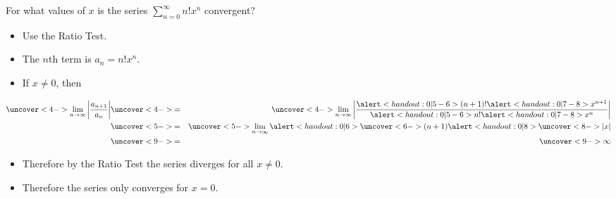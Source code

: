 \begin{frame}
\begin{example}[Example 1, p. 759]
For what values of $x$ is the series $\sum_{n=0}^\infty n! x^n$ convergent?
\begin{itemize}
\item<2->  Use the Ratio Test.
\item<3->  The $n$th term is $a_n = n! x^n$.
\item<4->  If $x\neq 0$, then
\end{itemize}
\abovedisplayskip=0pt
\belowdisplayskip=0pt
\begin{eqnarray*}
\uncover<4->{%
\lim_{n\to\infty} \left| \frac{a_{n+1}}{a_n}\right|%
}%
& \uncover<4->{ = } &%
\uncover<4->{%
\lim_{n\to\infty} \left| \frac{\alert<handout:0| 5-6>{(n+1)!}\alert<handout:0| 7-8>{x^{n+1}}}{\alert<handout:0| 5-6>{n!}\alert<handout:0| 7-8>{x^n}}\right|%
}\\%
& \uncover<5->{ = } &%
\uncover<5->{%
\lim_{n\to\infty} \alert<handout:0| 6>{\uncover<6->{(n+1)}}\alert<handout:0| 8>{\uncover<8->{|x|}}%
}\\%
& \uncover<9->{ = } &%
\uncover<9->{%
\infty%
}%
\end{eqnarray*}
\begin{itemize}
\item<10->  Therefore by the Ratio Test the series diverges for all $x\neq 0$.
\item<11->  Therefore the series only converges for $x = 0$.
\end{itemize}
\end{example}
\end{frame}

